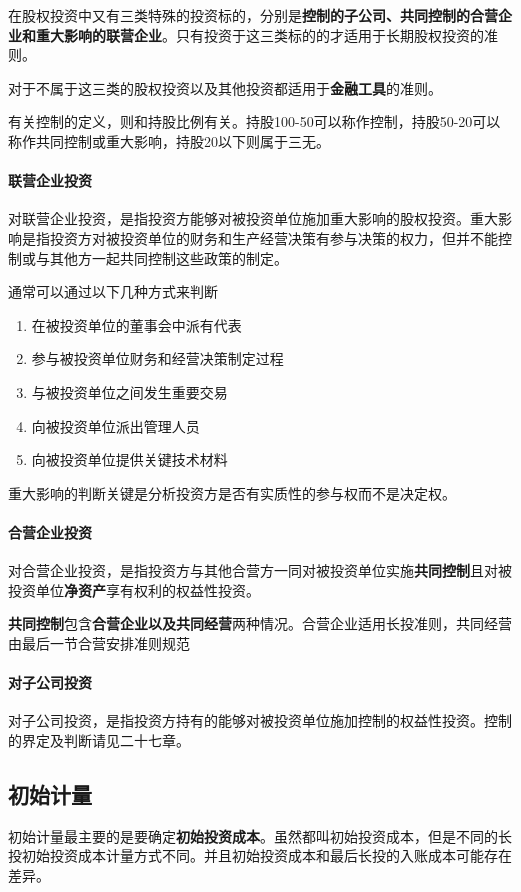 \documentclass[UTF8,12pt]{ctexart}
\numberwithin{equation}{section} %
\numberwithin{figure}{section}
\numberwithin{table}{section}
\begin{document}
	在股权投资中又有三类特殊的投资标的，分别是\textbf{控制的子公司、共同控制的合营企业和重大影响的联营企业}。只有投资于这三类标的的才适用于长期股权投资的准则。
	
	对于不属于这三类的股权投资以及其他投资都适用于\textbf{金融工具}的准则。
	
	有关控制的定义，则和持股比例有关。持股100-50可以称作控制，持股50-20可以称作共同控制或重大影响，持股20以下则属于三无。
	
	\paragraph{联营企业投资}
	对联营企业投资，是指投资方能够对被投资单位施加重大影响的股权投资。重大影响是指投资方对被投资单位的财务和生产经营决策有参与决策的权力，但并不能控制或与其他方一起共同控制这些政策的制定。
	
	通常可以通过以下几种方式来判断
	\begin{enumerate}
		\item 在被投资单位的董事会中派有代表
		
		\item 参与被投资单位财务和经营决策制定过程
		
		\item 与被投资单位之间发生重要交易
		
		\item 向被投资单位派出管理人员
		
		\item 向被投资单位提供关键技术材料
	\end{enumerate}
	
	重大影响的判断关键是分析投资方是否有实质性的参与权而不是决定权。
	
	\paragraph{合营企业投资}
	对合营企业投资，是指投资方与其他合营方一同对被投资单位实施\textbf{共同控制}且对被投资单位\textbf{净资产}享有权利的权益性投资。
	
	\textbf{共同控制}包含\textbf{合营企业以及共同经营}两种情况。合营企业适用长投准则，共同经营由最后一节合营安排准则规范
	
	\paragraph{对子公司投资}
	对子公司投资，是指投资方持有的能够对被投资单位施加控制的权益性投资。控制的界定及判断请见二十七章。
	
	\subsection{初始计量}
	初始计量最主要的是要确定\textbf{初始投资成本}。虽然都叫初始投资成本，但是不同的长投初始投资成本计量方式不同。并且初始投资成本和最后长投的入账成本可能存在差异。
	
\end{document}
